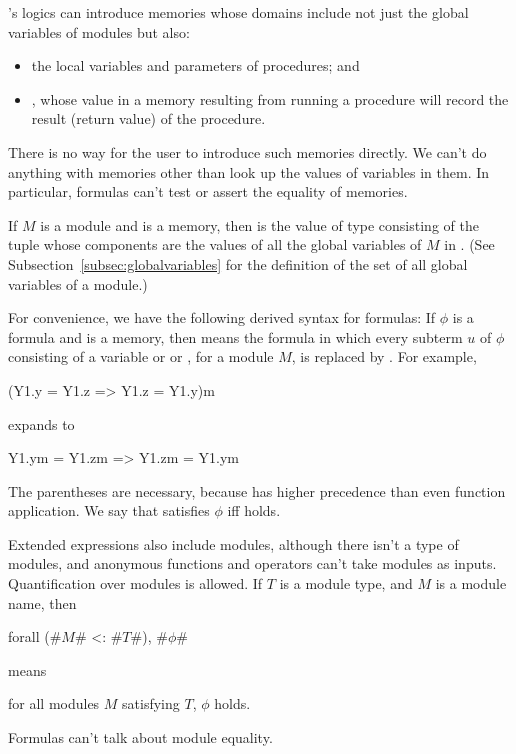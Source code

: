\EasyCrypt's logics can introduce memories whose domains include not
just the global variables of modules but also:
\begin{itemize}
\item the local variables and parameters of
  procedures; and

\item {}, whose value in a memory resulting from running a
  procedure will record the result (return value) of the procedure.
\end{itemize}
There is no way for the user to introduce such memories directly.  We
can't do anything with memories other than look up the values of
variables in them. In particular, formulas can't test or assert the
equality of memories.

If $M$ is a module and  is a memory, then  is the value of type  consisting of the
tuple whose components are the values of all the global variables of
$M$ in .  (See Subsection~\ref{subsec:globalvariables} for the
definition of the set of all global variables of a module.)

For convenience, we have the following derived syntax for formulas: If
$\phi$ is a formula and  is a memory, then 
means the formula in which every subterm $u$ of $\phi$ consisting of a
variable or  or , for a module
$M$, is replaced by .  For example,
\begin{easycrypt}{}{}
(Y1.y = Y1.z => Y1.z = Y1.y){m}
\end{easycrypt}
expands to
\begin{easycrypt}{}{}
Y1.y{m} = Y1.z{m} => Y1.z{m} = Y1.y{m}
\end{easycrypt}
The parentheses are necessary, because  has
higher precedence than even function application.
We say that  satisfies $\phi$ iff  holds.

Extended expressions also include modules, although there isn't a type
of modules, and anonymous functions and operators can't take modules
as inputs.  Quantification over modules is allowed. If $T$ is a module
type, and $M$ is a module name, then
\begin{easycrypt}{}{}
forall (#$M$# <: #$T$#), #$\phi$#
\end{easycrypt}
means
\begin{center}
 for all modules $M$ satisfying $T$, $\phi$ holds.
\end{center}
Formulas can't talk about module equality.

